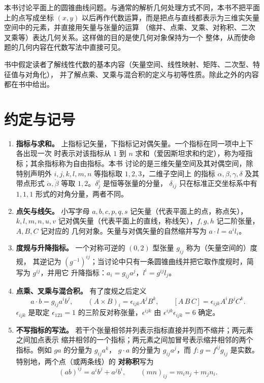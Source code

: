 本书讨论平面上的圆锥曲线问题。与通常的解析几何处理方式不同，本书不把平面上的点写成坐标 $(x,y)$
以后再作代数运算，而是把点与直线都表示为三维实矢量空间中的元素，并直接用矢量与张量的运算
（缩并、点乘、叉乘、对称积、二次叉乘等）表达几何关系。这样做的目的是使几何对象保持为一个
整体，从而使命题的几何内容在代数写法中直接可见。

书中假定读者了解线性代数的基本内容（矢量空间、线性映射、矩阵、二次型、特征值与对角化），
并了解点乘、叉乘与混合积的定义与初等性质。除此之外的内容都在书中给出。

\section*{约定与记号}

\begin{enumerate}[label=\textbf{(\arabic*)},leftmargin=2.2em]

\item \textbf{指标与求和。} 上指标记矢量，下指标记对偶矢量。一个指标在同一项中上下各出现一次
时表示对该指标从 $1$ 到 $n$ 求和（爱因斯坦求和约定），称为哑指标；其余指标称为自由指标。本书
讨论的是三维矢量空间及其对偶空间，除特别声明外 $i,j,k,l,m,n$ 等指标取 $1,2,3$，二维子空间上
的指标 $\alpha,\beta,\gamma,\delta$ 及其带点形式 $\dot\alpha,\dot\beta$ 等取 $1,2$。$\delta^i_j$ 是恒等张量的分量，
$\delta_{ij}$ 只在标准正交坐标系中有 $1,1,1$ 形式的对角分量，两者不同。

\item \textbf{点矢与线矢。} 小写字母 $a,b,c,p,q,s$ 记矢量（代表平面上的点，称点矢），
$k,l,m,n,u,v$ 记对偶矢量（代表平面上的直线，称线矢），$f,g,h$ 记二阶张量，$A,B,C$ 记对应的
几何对象。矢量与对偶矢量的自然缩并写为 $a\cdot l=a^il_i$。

\item \textbf{度规与升降指标。} 一个对称可逆的 $(0,2)$ 型张量 $g_{ij}$ 称为（矢量空间的）度规，
其逆记为 $(g^{-1})^{ij}$；当讨论中只有一条圆锥曲线并把它取作度规时，简写为 $g^{ij}$，并用它
升降指标：$a_i=g_{ij}a^j$，$l^i=g^{ij}l_j$。

\item \textbf{点乘、叉乘与混合积。} 有了度规之后定义
\[
a\cdot b=g_{ij}a^ib^j,\qquad
(A\times B)_i=\epsilon_{ijk}A^jB^k,\qquad
[A\,B\,C]=\epsilon_{ijk}A^iB^jC^k .
\]
$\epsilon_{ijk}$ 是取定 $\epsilon_{123}=1$ 的三阶反对称张量，$\epsilon^{ijk}$ 由 $\epsilon^{ijk}\epsilon_{ijk}=6$ 确定。

\item \textbf{不写指标的写法。} 若干个张量相邻并列表示指标直接并列而不缩并；两元素之间加点表示
缩并相邻的一个指标；两元素之间加冒号表示缩并相邻的两个指标。例如 $ga$ 的分量为 $g_{ij}a^k$，
$g\cdot a$ 的分量为 $g_{ij}a^j$，而 $f:g=f^{ij}g_{ij}$ 是实数。特别地，两个点（或两条线）的
\textbf{对称积}写为
\[
(a b)^{ij}=a^ib^j+a^jb^i,\qquad
(m n)_{ij}=m_in_j+m_jn_i .
\]


\end{enumerate}
